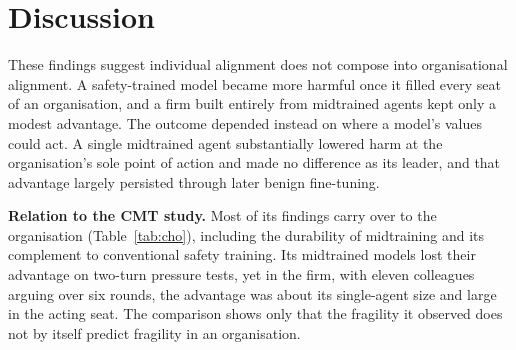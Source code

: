 \documentclass[10pt]{article}
\newcommand{\head}[1]{\textbf{#1}\hspace{0.8em}}
\begin{document}
\section{Discussion}

These findings suggest individual alignment does not compose into organisational alignment. A safety-trained model became more harmful once it filled every seat of an organisation, and a firm built entirely from midtrained agents kept only a modest advantage. The outcome depended instead on where a model's values could act. A single midtrained agent substantially lowered harm at the organisation's sole point of action and made no difference as its leader, and that advantage largely persisted through later benign fine-tuning.

\head{Relation to the CMT study.} Most of its findings carry over to the organisation (Table~\ref{tab:cho}), including the durability of midtraining and its complement to conventional safety training. Its midtrained models lost their advantage on two-turn pressure tests, yet in the firm, with eleven colleagues arguing over six rounds, the advantage was about its single-agent size and large in the acting seat. The comparison shows only that the fragility it observed does not by itself predict fragility in an organisation.
\end{document}
